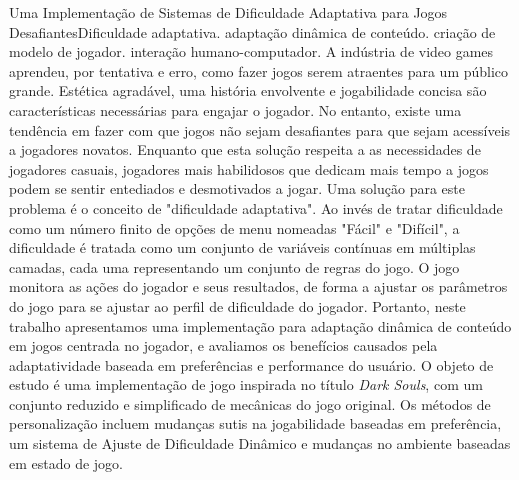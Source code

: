 \begin{englishabstract}{Uma Implementação de Sistemas de Dificuldade Adaptativa para Jogos Desafiantes}{Dificuldade adaptativa. adaptação dinâmica de conteúdo. criação de modelo de jogador. interação humano-computador.}
    A indústria de video games aprendeu, por tentativa e erro, como fazer jogos serem atraentes para um público grande. Estética agradável, uma história envolvente e jogabilidade concisa são características necessárias para engajar o jogador. No entanto, existe uma tendência em fazer com que jogos não sejam desafiantes para que sejam acessíveis a jogadores novatos. Enquanto que esta solução respeita a as necessidades de jogadores casuais, jogadores mais habilidosos que dedicam mais tempo a jogos podem se sentir entediados e desmotivados a jogar. Uma solução para este problema é o conceito de "dificuldade adaptativa". Ao invés de tratar dificuldade como um número finito de opções de menu nomeadas "Fácil" e "Difícil", a dificuldade é tratada como um conjunto de variáveis contínuas em múltiplas camadas, cada uma representando um conjunto de regras do jogo. O jogo monitora as ações do jogador e seus resultados, de forma a ajustar os parâmetros do jogo para se ajustar ao perfil de dificuldade do jogador. Portanto, neste trabalho apresentamos uma implementação para adaptação dinâmica de conteúdo em jogos centrada no jogador, e avaliamos os benefícios causados pela adaptatividade baseada em preferências e performance do usuário. O objeto de estudo é uma implementação de jogo inspirada no título \emph{Dark Souls}, com um conjunto reduzido e simplificado de mecânicas do jogo original. Os métodos de personalização incluem mudanças sutis na jogabilidade baseadas em preferência, um sistema de Ajuste de Dificuldade Dinâmico e mudanças no ambiente baseadas em estado de jogo.
\end{englishabstract}